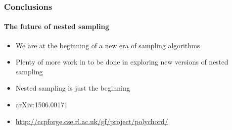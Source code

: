 \documentclass[]{beamer}
\begin{document}
\begin{frame}
  \frametitle{Conclusions}
  \framesubtitle{The future of nested sampling}

  \begin{itemize}
      \pause
    \item We are at the beginning of a new era of sampling algorithms
      \pause
    \item Plenty of more work in to be done in exploring new versions of nested sampling
      \pause
    \item Nested sampling is just the beginning
      \pause
    \item arXiv:1506.00171
      \pause
    \item \href{http://ccpforge.cse.rl.ac.uk/gf/project/polychord/}{http://ccpforge.cse.rl.ac.uk/gf/project/polychord/}
  \end{itemize}

\end{frame}
\end{document}
